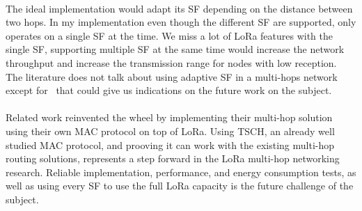 \documentclass[11pt]{report}
\begin{document}
\paragraph{}

The ideal implementation would adapt its SF depending on the distance
between two hops.
In my implementation even though the different SF are supported, only operates
on a single SF at the time. 
We miss a lot of LoRa features with the single SF, supporting multiple SF at
the same time would increase the network throughput and increase the
transmission range for nodes with low reception.
The literature does not talk about using adaptive SF in a multi-hops
network except for~\cite{8115756} that could give us indications on the future
work on the subject.

\paragraph{}

Related work reinvented the wheel by implementing their multi-hop solution
using their own MAC protocol on top of LoRa.
Using TSCH, an already well studied MAC protocol,
and prooving it can work with the existing multi-hop routing solutions,
represents a step forward in the LoRa multi-hop networking research.
Reliable implementation, performance, and energy consumption tests, as well as 
using every SF to use the full LoRa capacity is the future challenge of the
subject.

\newpage

\printbibliography

\newpage

\begin{appendices}

\end{appendices}
\end{document}
